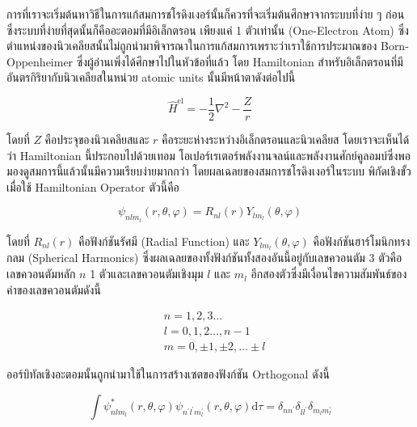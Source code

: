 การที่เราจะเริ่มต้นหาวิธีในการแก้สมการชโรดิงเงอร์นั้นก็ควรที่จะเริ่มต้นศึกษาจากระบบที่ง่าย ๆ ก่อนซึ่งระบบที่ง่ายที่สุดนั้นก็คืออะตอมที่มีอิเล็กตรอน%
เพียงแค่ 1 ตัวเท่านั้น (One-Electron Atom)  ซึ่งตำแหน่งของนิวเคลียสนั้นไม่ถูกนำมาพิจารณาในการแก้สมการเพราะว่าเราใช้การประมาณของ
Born-Oppenheimer ซึ่งผู้อ่านเพิ่งได้ศึกษาไปในหัวข้อที่แล้ว โดย Hamiltonian สำหรับอิเล็กตรอนที่มีอันตรกิริยากับนิวเคลียสในหน่วย atomic
units นั้นมีหน้าตาดังต่อไปนี้

\begin{equation}
  \hat{H}^{\text{el}}
  =
  - \frac{1}{2} \nabla^{2}-\frac{Z}{r}
\end{equation}

โดยที่ $Z$ คือประจุของนิวเคลียสและ $r$ คือระยะห่างระหว่างอิเล็กตรอนและนิวเคลียส โดยเราจะเห็นได้ว่า Hamiltonian นี้ประกอบไปด้วยเทอม%
โอเปอร์เรเตอร์พลังงานจลน์และพลังงานศักย์คูลอมบ์ซึ่งพอมองดูสมการนี้แล้วนั้นมีความเรียบง่ายมากกว่า โดยผลเฉลยของสมการชโรดิงเงอร์ในระบบ%
พิกัดเชิงขั้วเมื่อใช้ Hamiltonian Operator ตัวนี้คือ

\begin{equation}
  \psi_{nlm_{l}} (r, \theta, \varphi)
  =
  R_{nl}(r) Y_{lm_{l}} (\theta, \varphi)
\end{equation}

\noindent โดยที่ $R_{nl}(r)$ คือฟังก์ชันรัศมี (Radial Function) และ $Y_{lm_{l}}(\theta, \varphi)$ คือฟังก์ชันฮาร์โมนิกทรงกลม
(Spherical Harmonics) ซึ่งผลเฉลยของทั้งฟังก์ชันทั้งสองอันนี้อยู่กับเลขควอนตัม 3 ตัวคือเลขควอนตัมหลัก $n$ 1 ตัวและเลขควอนตัมเชิงมุม
$l$ และ $m_{l}$ อีกสองตัวซึ่งมีเงื่อนไขความสัมพันธ์ของค่าของเลขควอนตัมดังนี้

\begin{equation*}
  \begin{aligned}
     & n = 1,2,3 \ldots                  \\
     & l = 0,1,2 \ldots, n-1             \\
     & m = 0, \pm 1, \pm 2, \ldots \pm l
  \end{aligned}
\end{equation*}

ออร์บิทัลเชิงอะตอมนั้นถูกนำมาใช้ในการสร้างเซตของฟังก์ชัน Orthogonal ดังนี้

\begin{equation}
  \int \psi_{nlm_{l}}^{*} (r, \theta, \varphi)
  \psi_{n^{\prime} l^{\prime} m^{\prime}_{l}} (r, \theta, \varphi)
  \mathrm{d} \tau
  = \delta_{n n^{\prime}}
  \delta_{l l^{\prime}}
  \delta_{m_{l} m_{l}^{\prime}}
\end{equation}

